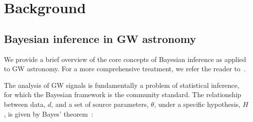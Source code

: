 \documentclass[fleqn,usenatbib]{mnras}
\begin{document}



\section{Background}

\subsection{Bayesian inference in GW astronomy}
\label{sec:background_bayes}
We provide a brief overview of the core concepts of
Bayesian inference as applied to GW astronomy. For a more
comprehensive treatment, we refer the reader to~\cite{skilling, Thrane_2019, lal, bilby_paper, LIGO_guide_signalextraction}.

The analysis of GW signals is fundamentally a problem of statistical
inference, for which the Bayesian framework is the community standard.
The relationship between data, $d$, and a set of source parameters,
$\theta$, under a specific hypothesis, $H$, is given by Bayes' theorem~\citep{Bayes1763}:
\end{document}
